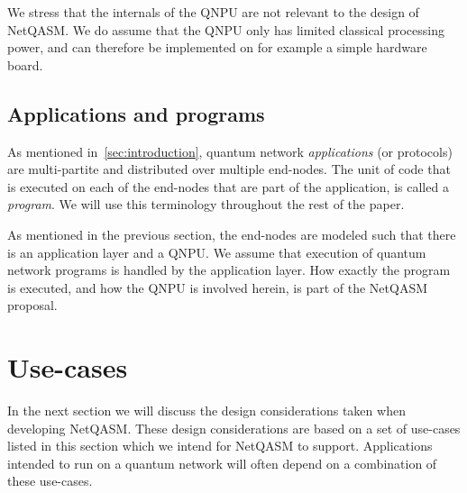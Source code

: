We stress that the internals of the \ac{QNPU} are not relevant to the design of \ac{NetQASM}.
We do assume that the \ac{QNPU} only has limited classical processing power, and can therefore be implemented on for example a simple hardware board.





\subsection{Applications and programs}
As mentioned in~\cref{sec:introduction}, quantum network \textit{applications} (or protocols) are multi-partite and distributed over multiple end-nodes.
The unit of code that is executed on each of the end-nodes that are part of the application, is called a \textit{program}.
We will use this terminology throughout the rest of the paper.

As mentioned in the previous section, the end-nodes are modeled such that there is an application layer and a \ac{QNPU}. We assume that execution of quantum network programs is handled by the application layer.
How exactly the program is executed, and how the \ac{QNPU} is involved herein, is part of the \ac{NetQASM} proposal.


\section{Use-cases}
\label{sec:use_cases}
In the next section we will discuss the design considerations taken when developing \ac{NetQASM}.
These design considerations are based on a set of use-cases listed in this section which we intend for \ac{NetQASM} to support.
Applications intended to run on a quantum network will often depend on a combination of these use-cases.

